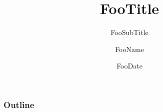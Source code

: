 \documentclass[t]{beamer}
\title{FooTitle}
\subtitle{FooSubTitle}
\author{FooName}
\institute{FooInstitution}
\date{FooDate}
\begin{document}
\begin{frame}
\titlepage
\end{frame}

\begin{frame}
\frametitle{Outline}
\tableofcontents
\end{frame}


\end{document}

